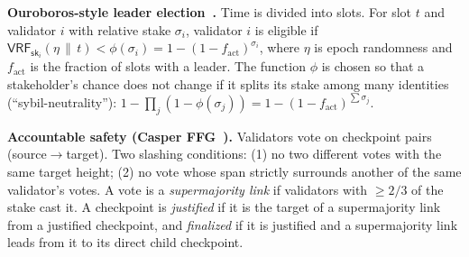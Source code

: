 \documentclass[11pt,a4paper]{article}
\newenvironment{formal}{\par\smallskip}{\par\smallskip}
\theoremstyle{definition}
\theoremstyle{plain}
\theoremstyle{remark}
\newcommand{\sk}{\mathsf{sk}}
\newcommand{\concat}{\,\|\,}
\begin{document}
\begin{formal}
\textbf{Ouroboros-style leader election~\cite{KRDO17}.} Time is divided into slots. For slot $t$ and validator $i$ with relative stake $\sigma_i$, validator $i$ is eligible if $\mathsf{VRF}_{\sk_i}(\eta\concat t)<\phi(\sigma_i)=1-(1-f_{\text{act}})^{\sigma_i}$, where $\eta$ is epoch randomness and $f_{\text{act}}$ is the fraction of slots with a leader. The function $\phi$ is chosen so that a stakeholder's chance
does not change if it splits its stake among many identities (``sybil-neutrality''): $1-\prod_j(1-\phi(\sigma_j))=1-(1-f_{\text{act}})^{\sum\sigma_j}$.

\textbf{Accountable safety (Casper FFG~\cite{BG17}).} Validators vote on checkpoint pairs (source$\to$target). Two slashing conditions: (1) no two different votes with the same target height; (2) no vote whose span strictly surrounds another of the same validator's votes. A vote is a \emph{supermajority link} if validators with $\ge2/3$ of the stake cast it. A checkpoint is \emph{justified} if it is the target of a supermajority link from a justified checkpoint, and \emph{finalized} if it is justified and a supermajority link leads from it to its direct child checkpoint.


\end{formal}
\end{document}
